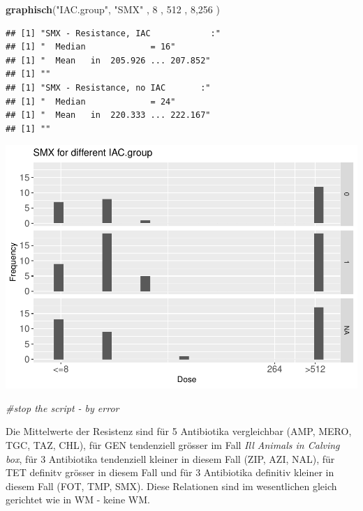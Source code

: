 \documentclass[
]{article}
\newenvironment{Shaded}{\begin{snugshade}}{\end{snugshade}}
\newcommand{\CommentTok}[1]{\textcolor[rgb]{0.56,0.35,0.01}{\textit{#1}}}
\newcommand{\DecValTok}[1]{\textcolor[rgb]{0.00,0.00,0.81}{#1}}
\newcommand{\KeywordTok}[1]{\textcolor[rgb]{0.13,0.29,0.53}{\textbf{#1}}}
\newcommand{\NormalTok}[1]{#1}
\newcommand{\StringTok}[1]{\textcolor[rgb]{0.31,0.60,0.02}{#1}}
\begin{document}
\begin{Shaded}
\begin{Highlighting}[]
   \KeywordTok{graphisch}\NormalTok{(}\StringTok{"IAC.group"}\NormalTok{, }\StringTok{"SMX"}\NormalTok{ , }\DecValTok{8}\NormalTok{    , }\DecValTok{512}\NormalTok{   ,   }\DecValTok{8}\NormalTok{,}\DecValTok{256}\NormalTok{    ) }
\end{Highlighting}
\end{Shaded}

\begin{verbatim}
## [1] "SMX - Resistance, IAC            :"
## [1] "  Median             = 16"
## [1] "  Mean   in  205.926 ... 207.852"
## [1] ""
## [1] "SMX - Resistance, no IAC       :"
## [1] "  Median             = 24"
## [1] "  Mean   in  220.333 ... 222.167"
## [1] ""
\end{verbatim}

\includegraphics{Verteilungen_files/figure-latex/unnamed-chunk-17-1.pdf}

\begin{Shaded}
\begin{Highlighting}[]
   \CommentTok{#stop the script - by error }
\end{Highlighting}
\end{Shaded}

Die Mittelwerte der Resistenz sind für 5 Antibiotika vergleichbar (AMP,
MERO, TGC, TAZ, CHL), für GEN tendenziell grösser im Fall \emph{Ill
Animals in Calving box}, für 3 Antibiotika tendenziell kleiner in diesem
Fall (ZIP, AZI, NAL), für TET definitv grösser in diesem Fall und für 3
Antibiotika definitiv kleiner in diesem Fall (FOT, TMP, SMX). Diese
Relationen sind im wesentlichen gleich gerichtet wie in WM - keine WM.
\end{document}
